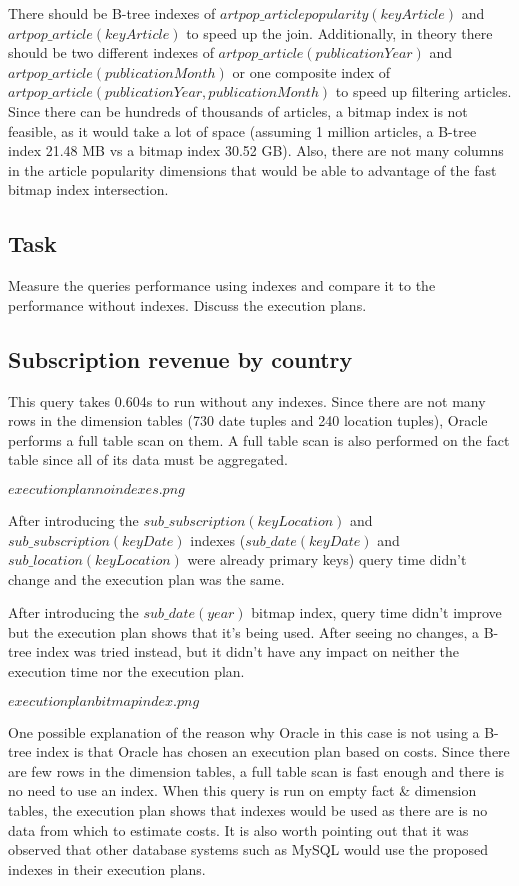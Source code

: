 There should be B-tree indexes of $artpop\_articlepopularity(keyArticle)$ and $artpop\_article(keyArticle)$ to speed up the join. Additionally, in theory there should be two different indexes of $artpop\_article(publicationYear)$ and $artpop\_article(publicationMonth)$ or one composite index of $artpop\_article(publicationYear, publicationMonth)$ to speed up filtering articles. Since there can be hundreds of thousands of articles, a bitmap index is not feasible, as it would take a lot of space (assuming 1 million articles, a B-tree index 21.48 MB vs a bitmap index 30.52 GB). Also, there are not many columns in the article popularity dimensions that would be able to advantage of the fast bitmap index intersection.

\subsection*{Task} 
Measure the queries performance using indexes and compare it to the
performance without indexes. Discuss the execution plans.

\subsection*{Subscription revenue by country} 
This query takes 0.604s to run without any indexes. Since there are not many rows in the dimension tables (730 date tuples and 240 location tuples), Oracle performs a full table scan on them. A full table scan is also performed on the fact table since all of its data must be aggregated.

$execution plan no indexes.png$

After introducing the $sub\_subscription(keyLocation)$ and $sub\_subscription(keyDate)$ indexes ($sub\_date(keyDate)$ and $sub\_location(keyLocation)$ were already primary keys) query time didn't change and the execution plan was the same.

After introducing the $sub\_date(year)$ bitmap index, query time didn't improve but the execution plan shows that it's being used. After seeing no changes, a B-tree index was tried instead, but it didn't have any impact on neither the execution time nor the execution plan.

$execution plan bitmap index.png$

One possible explanation of the reason why Oracle in this case is not using a B-tree index is that Oracle has chosen an execution plan based on costs. Since there are few rows in the dimension tables, a full table scan is fast enough and there is no need to use an index. When this query is run on empty fact \& dimension tables, the execution plan shows that indexes would be used as there are is no data from which to estimate costs. It is also worth pointing out that it was observed that other database systems such as MySQL would use the proposed indexes in their execution plans.

